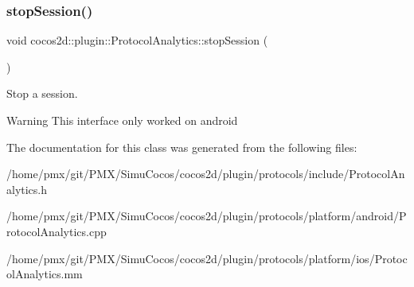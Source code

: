 \subsubsection{\texorpdfstring{stop\+Session()}{stopSession()}}
{\footnotesize\ttfamily void cocos2d\+::plugin\+::\+Protocol\+Analytics\+::stop\+Session (\begin{DoxyParamCaption}{ }\end{DoxyParamCaption})}



Stop a session. 

\begin{DoxyWarning}{Warning}
This interface only worked on android 
\end{DoxyWarning}


The documentation for this class was generated from the following files\+:\begin{DoxyCompactItemize}
\item 
/home/pmx/git/\+P\+M\+X/\+Simu\+Cocos/cocos2d/plugin/protocols/include/Protocol\+Analytics.\+h\item 
/home/pmx/git/\+P\+M\+X/\+Simu\+Cocos/cocos2d/plugin/protocols/platform/android/Protocol\+Analytics.\+cpp\item 
/home/pmx/git/\+P\+M\+X/\+Simu\+Cocos/cocos2d/plugin/protocols/platform/ios/Protocol\+Analytics.\+mm\end{DoxyCompactItemize}
